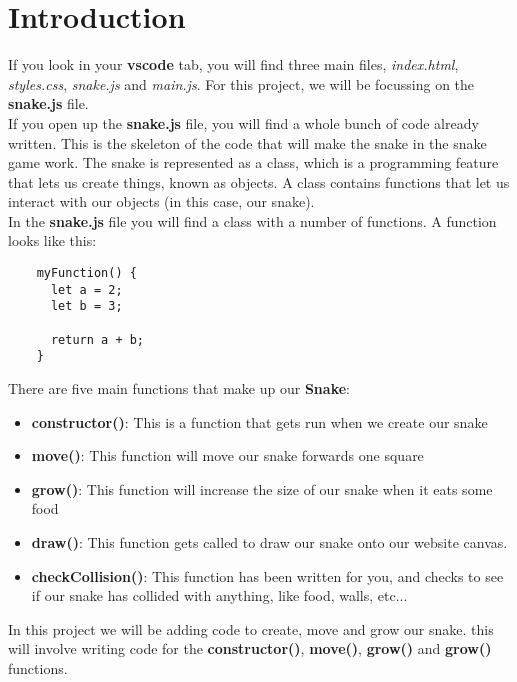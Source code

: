 \documentclass{article}
\begin{document}
  \section{Introduction}
  If you look in your \textbf{vscode} tab, you will find three main files, \textit{index.html},
  \textit{styles.css}, \textit{snake.js} and \textit{main.js}. For this project, we will be 
  focussing on the \textbf{snake.js} file. \\

  \noindent If you open up the \textbf{snake.js} file, you will find a whole bunch of code
  already written. This is the skeleton of the code that will make the snake in the snake
  game work. The snake is represented as a class, which is a programming feature that lets
  us create things, known as objects. A class contains functions that let us interact with
  our objects (in this case, our snake). \\

  \noindent In the \textbf{snake.js} file you will find a class with a number of functions.
  A function looks like this:

  \begin{verbatim}
    myFunction() {
      let a = 2;
      let b = 3;

      return a + b;
    }
  \end{verbatim}

  \noindent There are five main functions that make up our \textbf{Snake}:
  \begin{itemize}
    \item \textbf{constructor()}: This is a function that gets run when we create our snake
    \item \textbf{move()}: This function will move our snake forwards one square
    \item \textbf{grow()}: This function will increase the size of our snake when it eats some food
    \item \textbf{draw()}: This function gets called to draw our snake onto our website canvas.
    \item \textbf{checkCollision()}: This function has been written for you, and checks to see 
    if our snake has collided with anything, like food, walls, etc...
  \end{itemize}

  \noindent In this project we will be adding code to create, move and grow our snake. this
  will involve writing code for the \textbf{constructor()}, \textbf{move()}, \textbf{grow()}
  and \textbf{grow()} functions.
\end{document}
